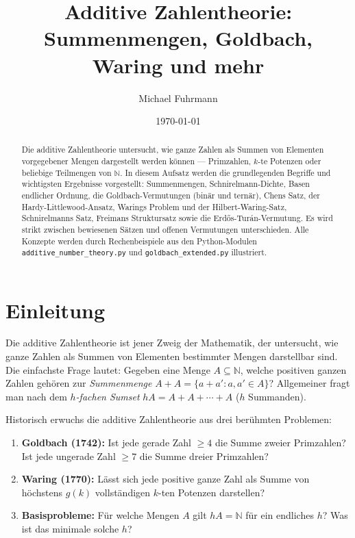\documentclass[12pt,a4paper]{amsart}
\title{Additive Zahlentheorie:\\
Summenmengen, Goldbach, Waring und mehr}
\author{Michael Fuhrmann}
\date{\today}
\theoremstyle{definition}
\newcommand{\N}{\mathbb{N}}
\begin{document}
\begin{abstract}
Die additive Zahlentheorie untersucht, wie ganze Zahlen als Summen von
Elementen vorgegebener Mengen dargestellt werden k\"{o}nnen --- Primzahlen,
$k$-te Potenzen oder beliebige Teilmengen von $\N$.
In diesem Aufsatz werden die grundlegenden Begriffe und wichtigsten
Ergebnisse vorgestellt: Summenmengen, Schnirelmann-Dichte, Basen endlicher
Ordnung, die Goldbach-Vermutungen (bin\"{a}r und tern\"{a}r),
Chens Satz, der Hardy-Littlewood-Ansatz, Warings Problem und der
Hilbert-Waring-Satz, Schnirelmanns Satz, Freimans Struktursatz sowie
die Erd\H{o}s-Tur\'{a}n-Vermutung.
Es wird strikt zwischen bewiesenen S\"{a}tzen und offenen Vermutungen
unterschieden.  Alle Konzepte werden durch Rechenbeispiele aus den
Python-Modulen \texttt{additive\_number\_theory.py} und
\texttt{goldbach\_extended.py} illustriert.
\end{abstract}

\maketitle
\tableofcontents

\section{Einleitung}\label{sec:einleitung}

Die additive Zahlentheorie ist jener Zweig der Mathematik, der
untersucht, wie ganze Zahlen als Summen von Elementen bestimmter Mengen
darstellbar sind.  Die einfachste Frage lautet: Gegeben eine Menge
$A \subseteq \N$, welche positiven ganzen Zahlen geh\"{o}ren zur
\emph{Summenmenge} $A + A = \{a + a' : a, a' \in A\}$?
Allgemeiner fragt man nach dem \emph{$h$-fachen Sumset}
$hA = A + A + \cdots + A$ ($h$ Summanden).

Historisch erwuchs die additive Zahlentheorie aus drei ber\"{u}hmten Problemen:

\begin{enumerate}[label=(\arabic*)]
\item \textbf{Goldbach (1742):} Ist jede gerade Zahl $\geq 4$ die Summe
      zweier Primzahlen?  Ist jede ungerade Zahl $\geq 7$ die Summe dreier
      Primzahlen?
\item \textbf{Waring (1770):} L\"{a}sst sich jede positive ganze Zahl als
      Summe von h\"{o}chstens $g(k)$ vollst\"{a}ndigen $k$-ten Potenzen
      darstellen?
\item \textbf{Basisprobleme:} F\"{u}r welche Mengen $A$ gilt $hA = \N$
      f\"{u}r ein endliches $h$?  Was ist das minimale solche $h$?
\end{enumerate}
\end{document}
